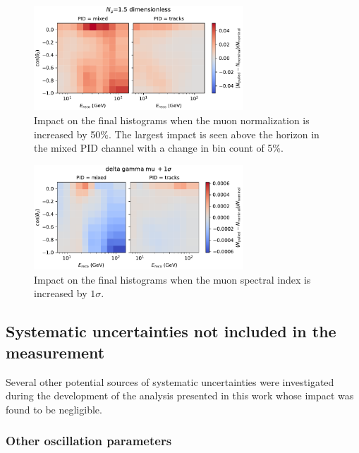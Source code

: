 \begin{figure}[H]
    \centering
    \includegraphics[width=0.7\textwidth,trim={0 0 0 0.6cm},clip]{figures/measurement/systematics/muons/weight_scale.pdf}
    \caption{Impact on the final histograms when the muon normalization is increased by 50\%. The largest impact is seen above the horizon in the mixed PID channel with a change in bin count of 5\%.}
    \label{fig:weight-scale-syst}
\end{figure}

\begin{figure}[H]
    \centering
    \includegraphics[width=0.7\textwidth,trim={0 0 0 0.6cm},clip]{figures/measurement/systematics/muons/delta_gamma_mu.pdf}
    \caption{Impact on the final histograms when the muon spectral index is increased by $1\sigma$.}
    \label{fig:delta-gamma-mu-syst}
\end{figure}

\subsection{Systematic uncertainties not included in the measurement}
\label{sec:other-uncertainties}

Several other potential sources of systematic uncertainties were investigated during the development of the analysis presented in this work whose impact was found to be negligible. 

\subsubsection{Other oscillation parameters}
\label{sec:other-oscillation-syst}

